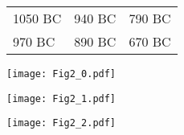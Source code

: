 \documentclass[12pt]{article}
\begin{document}
 

\begin{figure}
%

\begin{minipage}{8cm} 
\centering
\renewcommand{\arraystretch}{0.7}
    \begin{tabular}{lll}
 {\color{red} \raisebox{1pt}{ \scalebox{0.5}{$ \bigstar$} } {\tiny 1050 BC } } & {\color{green(ryb)} \raisebox{1pt}{ \scalebox{0.5}{$ \bigstar$} } {\tiny 940 BC } } &  {\color{magenta} \raisebox{1pt}{ \scalebox{0.5}{$ \bigstar$} } {\tiny 790 BC } } \\
{\color{orange(ryb)} \raisebox{1pt}{ \scalebox{0.5}{$ \bigstar$} } {\tiny 970 BC } } & {\color{blue} \raisebox{1pt}{ \scalebox{0.5}{$ \bigstar$} } {\tiny 890 BC } } & {\color{black} \raisebox{1pt}{ \scalebox{0.5}{$ \bigstar$} } {\tiny 670 BC } }\\
    \end{tabular}
\end{minipage}
\vfill
%
\begin{minipage}{8cm} 
\texttt{[image: Fig2\_0.pdf]}
\end{minipage}
\vfill
\begin{minipage}{8cm} 
\texttt{[image: Fig2\_1.pdf]}
\end{minipage}
\vfill
\begin{minipage}{8cm} 
\texttt{[image: Fig2\_2.pdf]}
\end{minipage}
\end{figure}
\end{document}
